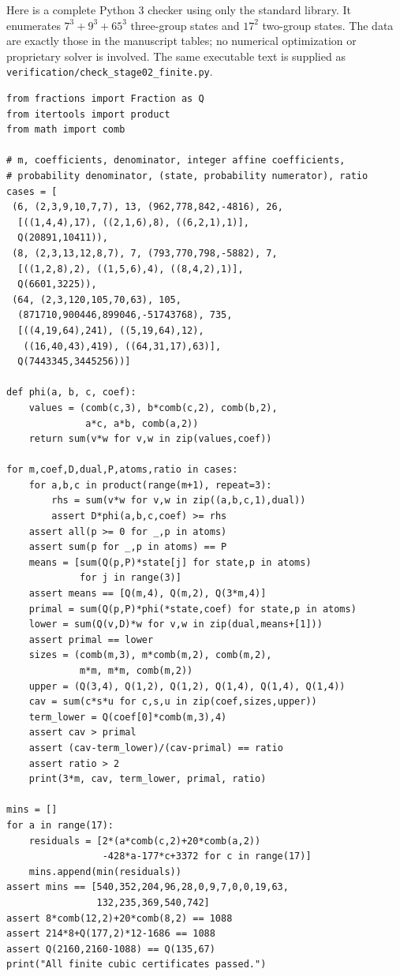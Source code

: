 Here is a complete Python 3 checker using only the standard library.
It enumerates $7^3+9^3+65^3$ three-group states and $17^2$ two-group
states. The data are exactly those in the manuscript tables; no numerical
optimization or proprietary solver is involved. The same executable text
is supplied as \texttt{verification/check\_stage02\_finite.py}.
\begingroup\small
\begin{verbatim}
from fractions import Fraction as Q
from itertools import product
from math import comb

# m, coefficients, denominator, integer affine coefficients,
# probability denominator, (state, probability numerator), ratio
cases = [
 (6, (2,3,9,10,7,7), 13, (962,778,842,-4816), 26,
  [((1,4,4),17), ((2,1,6),8), ((6,2,1),1)],
  Q(20891,10411)),
 (8, (2,3,13,12,8,7), 7, (793,770,798,-5882), 7,
  [((1,2,8),2), ((1,5,6),4), ((8,4,2),1)],
  Q(6601,3225)),
 (64, (2,3,120,105,70,63), 105,
  (871710,900446,899046,-51743768), 735,
  [((4,19,64),241), ((5,19,64),12),
   ((16,40,43),419), ((64,31,17),63)],
  Q(7443345,3445256))]

def phi(a, b, c, coef):
    values = (comb(c,3), b*comb(c,2), comb(b,2),
              a*c, a*b, comb(a,2))
    return sum(v*w for v,w in zip(values,coef))

for m,coef,D,dual,P,atoms,ratio in cases:
    for a,b,c in product(range(m+1), repeat=3):
        rhs = sum(v*w for v,w in zip((a,b,c,1),dual))
        assert D*phi(a,b,c,coef) >= rhs
    assert all(p >= 0 for _,p in atoms)
    assert sum(p for _,p in atoms) == P
    means = [sum(Q(p,P)*state[j] for state,p in atoms)
             for j in range(3)]
    assert means == [Q(m,4), Q(m,2), Q(3*m,4)]
    primal = sum(Q(p,P)*phi(*state,coef) for state,p in atoms)
    lower = sum(Q(v,D)*w for v,w in zip(dual,means+[1]))
    assert primal == lower
    sizes = (comb(m,3), m*comb(m,2), comb(m,2),
             m*m, m*m, comb(m,2))
    upper = (Q(3,4), Q(1,2), Q(1,2), Q(1,4), Q(1,4), Q(1,4))
    cav = sum(c*s*u for c,s,u in zip(coef,sizes,upper))
    term_lower = Q(coef[0]*comb(m,3),4)
    assert cav > primal
    assert (cav-term_lower)/(cav-primal) == ratio
    assert ratio > 2
    print(3*m, cav, term_lower, primal, ratio)

mins = []
for a in range(17):
    residuals = [2*(a*comb(c,2)+20*comb(a,2))
                 -428*a-177*c+3372 for c in range(17)]
    mins.append(min(residuals))
assert mins == [540,352,204,96,28,0,9,7,0,0,19,63,
                132,235,369,540,742]
assert 8*comb(12,2)+20*comb(8,2) == 1088
assert 214*8+Q(177,2)*12-1686 == 1088
assert Q(2160,2160-1088) == Q(135,67)
print("All finite cubic certificates passed.")
\end{verbatim}
\endgroup
